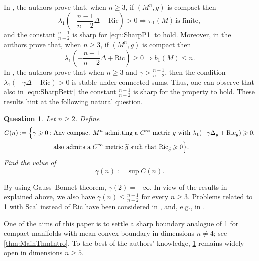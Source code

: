 \documentclass[12pt,a4paper,reqno]{amsart}
\newtheorem{question}{Question}
\theoremstyle{definition}
\renewcommand{\leq}{\leqslant}
\renewcommand{\geq}{\geqslant}
\renewcommand{\tilde}{\widetilde}
\begin{document}
In \cite{AX24}, the authors prove that, when $n\geq 3$, if $(M^n,g)$ is compact then
\begin{equation}\label{eqn:SharpP1}
\lambda_1\left(-\frac{n-1}{n-2}\Delta+\mathrm{Ric}\right)>0 \Rightarrow \pi_1(M)\, \text{is finite},
\end{equation}
and the constant $\frac{n-1}{n-2}$ is sharp for \eqref{eqn:SharpP1} to hold.
Moreover, in \cite{BourCarron} the authors prove that, when $n\geq 3$, if $(M^n,g)$ is compact then
\begin{equation}\label{eqn:SharpBetti}
\lambda_1\left(-\frac{n-1}{n-2}\Delta+\mathrm{Ric}\right)\geq 0 \Rightarrow b_1(M)\leq n.
\end{equation}
In \cite{AX25}, the authors prove that when $n\geq 3$ and $\gamma>\frac{n-1}{n-2}$, then the condition $\lambda_1(-\gamma\Delta+\mathrm{Ric})>0$ is stable under connected sums. Thus, one can observe that also in \eqref{eqn:SharpBetti} the constant $\frac{n-1}{n-2}$ is sharp for the property to hold. These results hint at the following natural question. 
\begin{question}\label{Question}
    Let $n\geq 2$. Define
    \[
\begin{aligned}
C(n):=\Bigl\{\gamma\geq 0:\;&\text{Any compact $M^n$ admitting a $C^\infty$ metric $g$ with $\lambda_{1}(-\gamma\Delta_g+\mathrm{Ric}_g)\geq 0$,}\\
&\text{also admits a $C^\infty$ metric $\tilde g$ such that $\mathrm{Ric}_{\tilde g}\geq 0$}\Bigr\}.
\end{aligned}
\]
Find the value of 
\[
\gamma(n):=\sup C(n).
\]
\end{question}
By using Gauss--Bonnet theorem, $\gamma(2)=+\infty$. In view of the results in \cite{AX24, AX25} explained above, we also have $\gamma(n)\leq \frac{n-1}{n-2}$ for every $n\geq 3$. Problems related to \cref{Question} with $\mathrm{Scal}$ instead of $\mathrm{Ric}$ have been considered in \cite[6.1.2]{FourLectures}, and, e.g., in \cite{LiMantoulidisFlexibility, HirschKazarasKhuriYiyueSpectralTorical}.

One of the aims of this paper is to settle a sharp boundary analogue of \cref{Question}
for compact manifolds with mean-convex boundary in dimensions $n\neq 4$;
see \cref{thm:MainThmIntro}. To the best of the authors' knowledge, \cref{Question} remains widely open in dimensions
$n\geq 5$.
\end{document}
